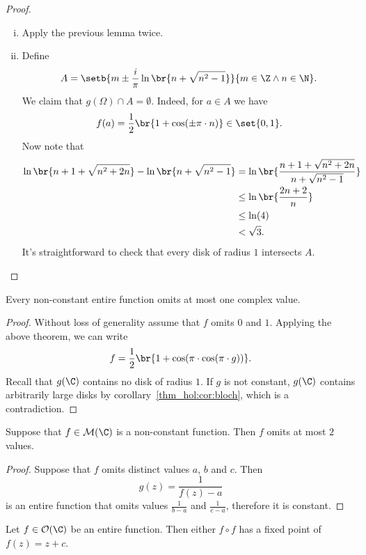 \begin{proof}
\phantom{a}
\begin{enumerate}[i)]
\item Apply the previous lemma twice.
\item Define
\[
A =
\setb{m \pm \frac{i}{\pi} \ln \br{n + \sqrt{n^2-1}}}
{m \in \Z \land n \in \N}.
\]
We claim that $g(\Omega) \cap A = \emptyset$. Indeed, for $a \in A$
we have
\[
f(a) = \frac{1}{2} \br{1 + \cos(\pm \pi \cdot n)} \in \set{0,1}.
\]
Now note that
\begin{align*}
\ln \br{n+1 + \sqrt{n^2 + 2n}} - \ln \br{n + \sqrt{n^2-1}} &=
\ln \br{\frac{n+1 + \sqrt{n^2 + 2n}}{n + \sqrt{n^2 - 1}}}
\\
&\leq
\ln \br{\frac{2n + 2}{n}}
\\
&\leq \ln(4)
\\
&<
\sqrt{3}.
\end{align*}
It's straightforward to check that every disk of radius $1$
intersects $A$. \qedhere
\end{enumerate}
\end{proof}

\begin{izrek}
Every non-constant entire function omits at most one complex value.
\end{izrek}

\begin{proof}
Without loss of generality assume that $f$ omits $0$ and $1$.
Applying the above theorem, we can write
\[
f = \frac{1}{2} \br{1 + \cos(\pi \cdot \cos(\pi \cdot g))}.
\]
Recall that $g(\C)$ contains no disk of radius $1$. If $g$ is
not constant, $g(\C)$ contains arbitrarily large disks by
corollary~\ref{thm_hol:cor:bloch}, which is a contradiction.
\end{proof}

\begin{posledica}
Suppose that $f \in \mathcal{M}(\C)$ is a non-constant function.
Then $f$ omits at most $2$ values.
\end{posledica}

\begin{proof}
Suppose that $f$ omits distinct values $a$, $b$ and $c$. Then
\[
g(z) = \frac{1}{f(z) - a}
\]
is an entire function that omits values $\frac{1}{b-a}$ and
$\frac{1}{c-a}$, therefore it is constant.
\end{proof}

\begin{izrek}
Let $f \in \mathcal{O}(\C)$ be an entire function. Then either
$f \circ f$ has a fixed point of $f(z) = z + c$.
\end{izrek}

